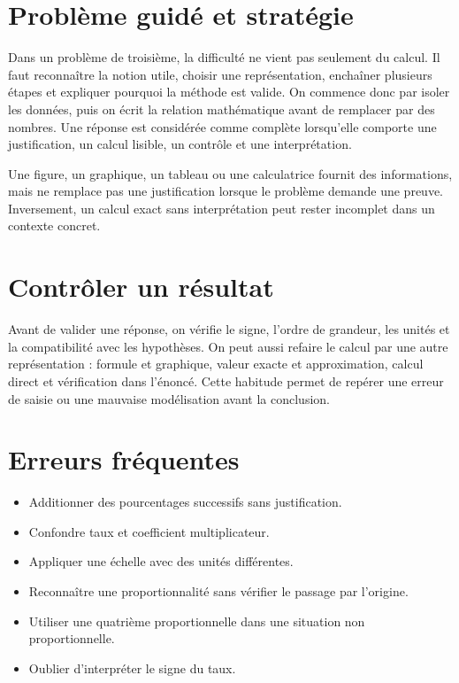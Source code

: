\section{Problème guidé et stratégie}
Dans un problème de troisième, la difficulté ne vient pas seulement du calcul. Il faut reconnaître la notion utile, choisir une représentation, enchaîner plusieurs étapes et expliquer pourquoi la méthode est valide. On commence donc par isoler les données, puis on écrit la relation mathématique avant de remplacer par des nombres. Une réponse est considérée comme complète lorsqu’elle comporte une justification, un calcul lisible, un contrôle et une interprétation.

\begin{attention}
Une figure, un graphique, un tableau ou une calculatrice fournit des informations, mais ne remplace pas une justification lorsque le problème demande une preuve. Inversement, un calcul exact sans interprétation peut rester incomplet dans un contexte concret.
\end{attention}

\section{Contrôler un résultat}
Avant de valider une réponse, on vérifie le signe, l’ordre de grandeur, les unités et la compatibilité avec les hypothèses. On peut aussi refaire le calcul par une autre représentation : formule et graphique, valeur exacte et approximation, calcul direct et vérification dans l’énoncé. Cette habitude permet de repérer une erreur de saisie ou une mauvaise modélisation avant la conclusion.

\section{Erreurs fréquentes}
\begin{itemize}
\item Additionner des pourcentages successifs sans justification.
\item Confondre taux et coefficient multiplicateur.
\item Appliquer une échelle avec des unités différentes.
\item Reconnaître une proportionnalité sans vérifier le passage par l’origine.
\item Utiliser une quatrième proportionnelle dans une situation non proportionnelle.
\item Oublier d’interpréter le signe du taux.
\end{itemize}

